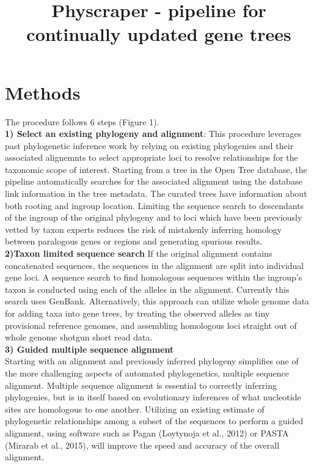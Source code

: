 \documentclass[a4paper,10pt]{article}
\title{Physcraper - pipeline for continually updated gene trees}
\author{}
\begin{document}
\maketitle

\begin{abstract}

\end{abstract}

\section{Methods}
The procedure follows 6 steps (Figure 1).\\

\textbf{1) Select an existing phylogeny and alignment}:
This procedure leverages past phylogenetic inference work by relying on existing phylogenies and their associated alignemnts to select appropriate loci to resolve relationships for the taxonomic scope of interest.
Starting from a tree in the Open Tree database, the pipeline automatically searches for the associated alignment using the database link information in the tree metadata. 
The curated trees have information about both rooting and ingroup location. Limiting the sequence search to descendants of the ingroup of the original phylogeny 
and to loci which have been previously vetted by taxon experts reduces the risk of mistakenly inferring homology between paralogous genes or regions and generating spurious results.\\

 \textbf{2)Taxon limited sequence search} 
If the original alignment contains concatenated sequences, the sequences in the alignment are split into individual gene loci.
A sequence search to find homologous sequences within the ingroup's taxon is conducted using each of the alleles in the alignment.
Currently this search uses GenBank.
Alternatively, this approach can utilize whole genome data for adding taxa into gene trees, by treating the observed alleles as tiny provisional reference genomes, 
and assembling homologous loci straight out of whole genome shotgun short read data.\\

\textbf{3) Guided multiple sequence alignment}\\
Starting with an alignment and previously inferred phylogeny simplifies one of the more challenging aspects of automated phylogenetics, multiple sequence alignment.
Multiple sequence alignment is essential to correctly inferring phylogenies, but is in itself based on evolutionary inferences of what nucleotide sites are homologous to one another.
Utilizing an existing estimate of phylogenetic relationships among a subset of the sequences to perform a guided alignment, 
using software such as Pagan (Loytynoja et al., 2012) or PASTA (Mirarab et al., 2015), will improve the speed and accuracy of the overall alignment.
\end{document}
